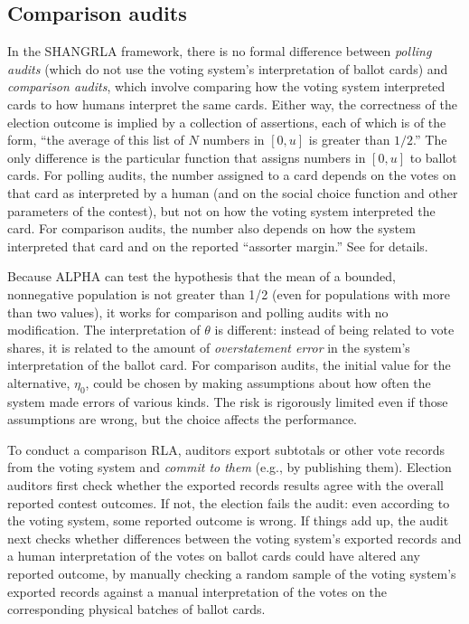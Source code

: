 \documentclass[12pt,runningheads]{llncs}
\begin{document}
{\subsection{Comparison audits} \label{sec:comparison-audits}
In the SHANGRLA framework, there is no formal difference between \emph{polling audits} (which do not use the voting system's
interpretation of ballot cards) and \emph{comparison audits}, which involve comparing how the voting system interpreted cards to 
how humans interpret the same cards.
Either way, the correctness of the election outcome is implied by a collection of assertions, each of which is of the form, 
``the average of this list of $N$ numbers in $[0, u]$ is greater than $1/2$.''
The only difference is the particular function that assigns numbers in $[0, u]$ to ballot cards.
For polling audits, the number assigned to a card depends on the votes on that card as interpreted by a human (and on the social
choice function and other parameters of the contest), but not on how the voting system interpreted the card.
For comparison audits, the number also depends on how the system interpreted that card and on the reported ``assorter margin.''
See \cite{stark20} for details.

Because ALPHA can test the hypothesis that the mean of a bounded, nonnegative population is not greater than 1/2 
(even for populations with more than two values), it works for comparison and polling audits with no modification.
The interpretation of $\theta$ is different: instead of being related to vote shares, it is related to the amount of \emph{overstatement error}
in the system's interpretation of the ballot card.
For comparison audits, the initial value for the alternative, $\eta_0$, could be chosen by making assumptions 
about how often the system made errors of various kinds.
The risk is rigorously limited even if those assumptions are wrong, but the choice affects the performance.

To conduct a comparison RLA, auditors export subtotals or other vote records from the voting system and \emph{commit to them} 
(e.g., by publishing them).
Election auditors first check whether the exported records results agree with the overall reported contest outcomes.
If not, the election fails the audit: even according to the voting system, some
reported outcome is wrong.
If things add up, the audit next checks whether differences between the voting system's exported records and a human interpretation
of the votes on ballot cards could have altered any reported outcome, by
manually checking a random sample of the voting system's exported records against a manual interpretation of
the votes on the corresponding physical batches of ballot cards.

}
\end{document}
